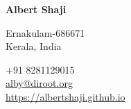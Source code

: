 \begin{multicols}{2}

{\LARGE\bfseries Albert Shaji}
\bigskip\bigskip %

Ernakulam-686671\\
Kerala, India
\medskip

+91 8281129015\\
\href{mailto:alby@disroot.org}{alby@diroot.org}\\
\href{https://albertshaji.github.io/}{https://albertshaji.github.io}\\
\medskip


\end{multicols}


